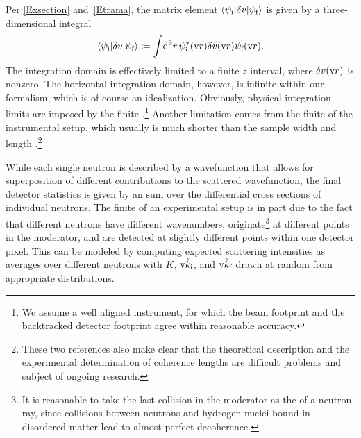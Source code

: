 Per \cref{Exsection} and~\cref{Etrama},
%
the matrix element $\left\langle \psi_{\text{i}}|\delta v|\psi_{\text{f}}\right\rangle$
is given by a three-dimensional integral
\begin{equation}\label{Etrama3}
  \left\langle \psi_{\text{i}}|\delta v|\psi_{\text{f}}\right\rangle
  \coloneqq  \int\!\mathrm d^3r\, \psi^{*}_{\text{i}}(\text{v}{r})\delta v(\text{v}{r})\psi_{\text{f}}(\text{v}{r}).
\end{equation}
The integration domain is effectively limited to a finite $z$ interval,
where $\delta v(\text{v}{r})$ is nonzero.
The horizontal integration domain, however, is infinite
within our formalism,
which is of course an idealization.
Obviously, physical integration limits are imposed by the finite
%
.\footnote
{We assume a well aligned instrument,
for which the beam footprint and the backtracked detector footprint
%
%
%
agree within reasonable accuracy.}
Another limitation comes from the finite 
of the instrumental setup,
which usually is much shorter than the sample width and length
\cite{HaPR10,MaMM14}.\footnote
{These two references also make clear that
  the theoretical description and the experimental determination of
  coherence lengths are difficult problems and subject of ongoing research.}

While each single neutron is described by a wavefunction
that allows for  superposition of
different contributions to the scattered wavefunction,
the final detector statistics
%
is given by an  sum
over the differential cross sections of individual neutrons.
The finite 
%
of an experimental setup is in part due to the fact that
different neutrons have different wavenumbers,
originate\footnote
{It is reasonable to take the last collision in the moderator
  as the  of a neutron ray,
  since collisions between neutrons and hydrogen nuclei bound in
  disordered matter lead to almost perfect decoherence.}
at different points in the moderator,
and are detected at slightly different points within one detector pixel.
This can be modeled by computing expected scattering intensities as
averages over different neutrons with
$K$, $\text{v}{\hat k}_{\text{i}}$, and $\text{v}{\hat k}_{\text{f}}$ drawn at random
from appropriate distributions.

